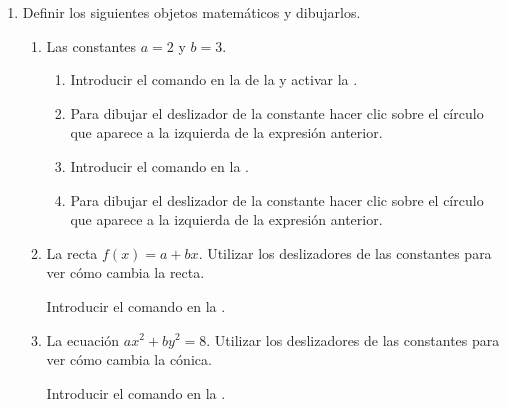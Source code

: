 \begin{enumerate}
\item Definir los siguientes objetos matemáticos y dibujarlos.
      \begin{enumerate}
      \item Las constantes $a=2$ y $b=3$.
            \begin{indication}
            \begin{enumerate}
            \item Introducir el comando  en la  de la  y activar la .
            \item Para dibujar el deslizador de la constante hacer clic sobre el círculo que aparece a la izquierda de la expresión anterior.
            \item Introducir el comando  en la .
            \item Para dibujar el deslizador de la constante hacer clic sobre el círculo que aparece a la izquierda de la expresión anterior.
            \end{enumerate}
            \end{indication}
      \item La recta $f(x)=a+bx$.
            Utilizar los deslizadores de las constantes para ver cómo cambia la recta.
            \begin{indication}
            Introducir el comando  en la .
            \end{indication}
      \item La ecuación $ax^2+by^2=8$.
            Utilizar los deslizadores de las constantes para ver cómo cambia la cónica.
            \begin{indication}
            Introducir el comando  en la .
            \end{indication}
      \end{enumerate}


\end{enumerate}
